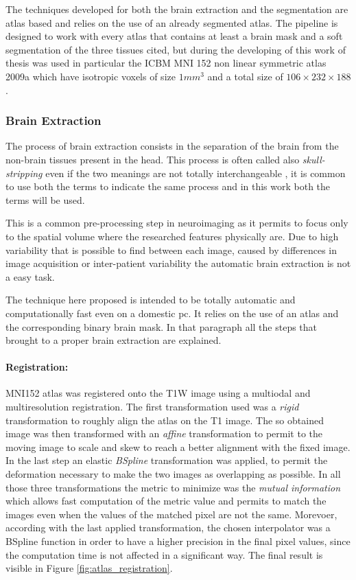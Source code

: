 \documentclass{standalone}
\begin{document}
The techniques developed for both the brain extraction and the segmentation are atlas based and relies on the use of an already segmented atlas.
The pipeline is designed to work with every atlas that contains at least a brain mask and a soft segmentation of the three tissues cited, but during the developing of this work of thesis was used in particular the ICBM MNI 152 non linear symmetric atlas 2009a which have isotropic voxels of size $1mm^3$  and a total size of $106 \times 232 \times 188$ \cite{MNI152_09a}.




\subsubsection{Brain Extraction}

The process of brain extraction consists in the separation of the brain from the non-brain tissues present in the head. This process is often called also \textit{skull-stripping} even if the two meanings are not totally interchangeable \cite{ART:Han}, it is common to use both the terms to indicate the same process and in this work both the terms will be used. 

This is a common pre-processing step in neuroimaging as it permits to focus only to the spatial volume where the researched features physically are. 
Due to high variability that is possible to find between each image, caused by differences in image acquisition or inter-patient variability the automatic brain extraction is not a easy task.

The technique here proposed is intended to be totally automatic and computationally fast even on a domestic pc. It relies on the use of an atlas and the corresponding binary brain mask.
In that paragraph all the steps that brought to a proper brain extraction are explained.



\paragraph{Registration:}
MNI152 atlas was registered onto the T1W image using a multiodal and multiresolution registration. 
The first transformation used was a \emph{rigid} transformation to roughly align the atlas on the T1 image.
The so obtained image was then transformed with an \emph{affine} transformation to permit to the moving image to scale and skew to reach a better alignment with the fixed image.
In the last step an elastic \emph{BSpline} transformation was applied, to permit the deformation necessary to make the two images as overlapping as possible.
In all those three transformations the metric to minimize was the \emph{mutual information} which allows fast computation of the metric value \cite{Elastix_manual} and permits to match the images even when the  values of the matched pixel are not the same.
Morevoer, according with the last applied transformation, the chosen interpolator was a BSpline function in order to have a higher precision in the final pixel values, since the computation time is not affected in a significant way.
The final result is visible in Figure \ref{fig:atlas_registration}.
\end{document}
